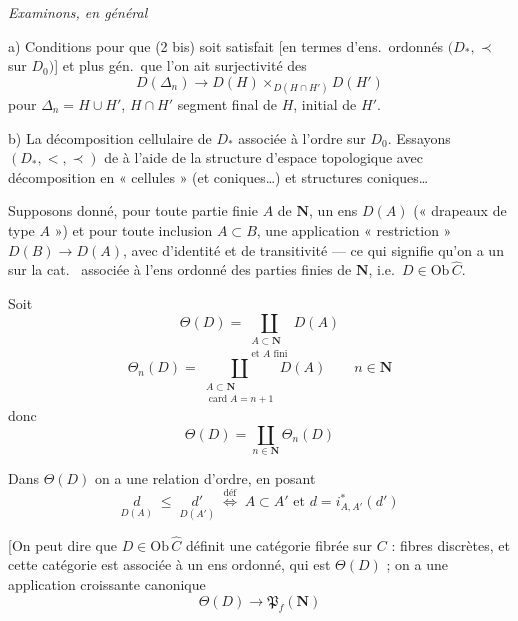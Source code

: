 \documentclass[11pt,a4paper]{article}
\begin{document}
\emph{Examinons, en général}

a) Conditions pour que (2 bis) soit satisfait [en termes d'ens.\ ordonnés
$(D_*, \prec$ sur $D_0)$] et plus gén.\ que l'on ait surjectivité des
\[
  D(\Delta_n) \longrightarrow D(H) \times_{D(H \cap H')} D(H')
\]
pour $\Delta_n = H \cup H'$, $H \cap H'$ segment final de $H$, initial de
$H'$.

b) La décomposition cellulaire de $D_*$ associée à l'ordre sur $D_0$.
Essayons  $(D_*, <, \prec)$ de
 à l'aide de la structure d'espace topologique
 avec décomposition en « cellules » (et coniques…)
et structures coniques…

Supposons donné, pour toute partie finie $A$ \add{$\neq \emptyset$} de
$\mathbf{N}$, un ens $D(A)$ (« drapeaux de type $A$ ») et pour toute
inclusion $A \subset B$, une application « restriction » $D(B) \to D(A)$,
avec  d'identité et de transitivité --- ce qui
signifie qu'on a un  
 sur la cat.\  associée à l'ens ordonné des
parties finies de $\mathbf{N}$, i.e.\ $D \in \mathrm{Ob}\, \widehat{C}$.

 Soit
\[
  \Theta(D) = \coprod_{\substack{A \subset \mathbf{N} \\ \text{et } A
  \text{ fini}}} D(A)
\]
\[
  \Theta_n(D) = \coprod_{\substack{A \subset \mathbf{N} \\
  \operatorname{card} A = n+1}} D(A) \qquad n \in \mathbf{N}
\]
donc
\[
  \Theta(D) = \coprod_{n \in \mathbf{N}} \Theta_n(D)
\]

Dans $\Theta(D)$ on a une relation d'ordre, en posant
\[
  \underset{D(A)}{d} \;\leqslant\; \underset{D(A')}{d'}
  \;\overset{\text{déf}}{\Longleftrightarrow}\; A \subset A' \text{ et } d =
  i^*_{A,A'}(d')
\]

[On peut dire que $D \in \mathrm{Ob}\, \widehat{C}$ définit une catégorie
fibrée sur $C$ : fibres discrètes, et cette catégorie est associée à un
ens ordonné, qui est $\Theta(D)$ ; on a une application croissante
canonique
\[
  \Theta(D) \longrightarrow \mathfrak{P}_f(\mathbf{N})
\]
\end{document}
